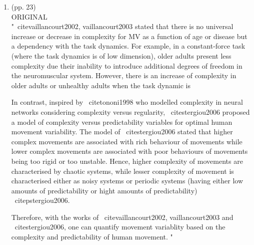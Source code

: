 \documentclass[12pt]{article}
\begin{document}
\begin{enumerate}
\item  (pp. 23)  \\ 
ORIGINAL \\
"\ cite{vaillancourt2002, vaillancourt2003} stated that there is no universal 
increase or decrease in complexity for MV as a function of age or disease 
but a dependency with the task dynamics. For example, in a constant-force 
task (where the task dynamics is of low dimension), older adults 
present less complexity due their inability to introduce additional degrees 
of freedom in the neuromuscular system. However, there is an increase of 
complexity in older adults or unhealthy adults when the task dynamic is 

In contrast, inspired by \ cite{tononi1998} who modelled complexity 
in neural networks considering complexity versus regularity,
\ cite{stergiou2006} proposed a model of complexity versus predictability 
variables for optimal human movement variability.
The model of \ cite{stergiou2006} stated that higher complex movements are 
associated with rich behaviour of movements while lower complex movements 
are associated with poor behaviours of movements being too rigid or too 
unstable. Hence, higher complexity of movements are characterised by 
chaotic systems, while lesser complexity of movement is characterised either 
as noisy systems or periodic systems (having either low amounts of 
predictability or hight amounts of predictability) \ citep{stergiou2006}.

Therefore, with the works 
of \ cite{vaillancourt2002, vaillancourt2003} and \ cite{stergiou2006},
one can quantify movement variablity 
based on the complexity and predictability of human movement.
"


\end{enumerate}
\end{document}
